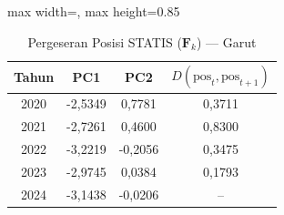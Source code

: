 \begin{table}[H]
\centering
\caption{Pergeseran Posisi STATIS ($\mathbf{F}_k$) --- Garut} \label{tab:app1jarak_statis_skor_garut}
\begin{adjustbox}{max width=\textwidth, max height=0.85\textheight}
\begin{tabular}{|c|c|c|c|}
\hline
\textbf{Tahun} & \textbf{PC1} & \textbf{PC2} & \textbf{$D(\text{pos}_t, \text{pos}_{t+1})$} \\
\hline
2020 & -2,5349 & 0,7781 & 0,3711 \\
2021 & -2,7261 & 0,4600 & 0,8300 \\
2022 & -3,2219 & -0,2056 & 0,3475 \\
2023 & -2,9745 & 0,0384 & 0,1793 \\
2024 & -3,1438 & -0,0206 & -- \\
\hline
\end{tabular}
\end{adjustbox}
\end{table}